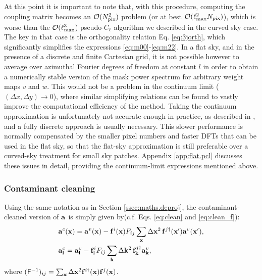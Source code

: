 \documentclass[usenatbib]{mnrasb}
\begin{document}
        At this point it is important to note that, with this procedure, computing the coupling matrix becomes an ${\cal O}(N_{\rm pix}^2)$ problem (or at best ${\cal O}(\ell_{\rm max}^2N_{\rm pix})$), which is worse than the ${\cal O}(\ell_{\rm max}^3$) pseudo-$C_\ell$ algorithm we described in the curved sky case. The key in that case is the orthogonality relation Eq. \ref{eq:3jorth}, which significantly simplifies the expressions \ref{eq:m00}-\ref{eq:m22}. In a flat sky, and in the presence of a discrete and finite Cartesian grid, it is not possible however to average over azimuthal Fourier degrees of freedom at constant $l$ in order to obtain a numerically stable version of the mask power spectrum for arbitrary weight maps $v$ and $w$. This would not be a problem in the continuum limit ($(\Delta x,\Delta y)\rightarrow0$), where similar simplifying relations can be found to vastly improve the computational efficiency of the method. Taking the continuum approximation is unfortunately not accurate enough in practice, as described in \cite{2016arXiv161204664A}, and a fully discrete approach is usually necessary. This slower performance is normally compensated by the smaller pixel numbers and faster DFTs that can be used in the flat sky, so that the flat-sky approximation is still preferable over a curved-sky treatment for small sky patches. Appendix \ref{app:flat.pcl} discusses these issues in detail, providing the continuum-limit expressions mentioned above.
   
      \subsubsection{Contaminant cleaning}\label{sssec:maths.flat.deproj}
        Using the same notation as in Section \ref{ssec:maths.deproj}, the contaminant-cleaned version of ${\bf a}$ is simply given by(c.f. Eqs. \ref{eq:clean} and \ref{eq:clean_f}):
        \begin{align}
          &{\bf a}^c({\bf x})={\bf a}^v({\bf x})-{\bf f}^i({\bf x})F_{ij}\sum_{\bf x}\Delta{\bf x}^2\,{\bf f}^{j\dag}({\bf x}'){\bf a}^v({\bf x}'),\\
          &{\bf a}^c_{\bf l}={\bf a}^v_{\bf l}-{\bf f}^i_{\bf l}F_{ij}\sum_{\bf k}\Delta{\bf k}^2\,{\bf f}^{j\dag}_{\bf k}{\bf a}^v_{\bf k},
        \end{align}
        where $({\sf F}^{-1})_{ij}=\sum_{\bf x}\Delta{\bf x}^2{\bf f}^{i\dag}({\bf x}){\bf f}^j({\bf x})$.
    
\end{document}
